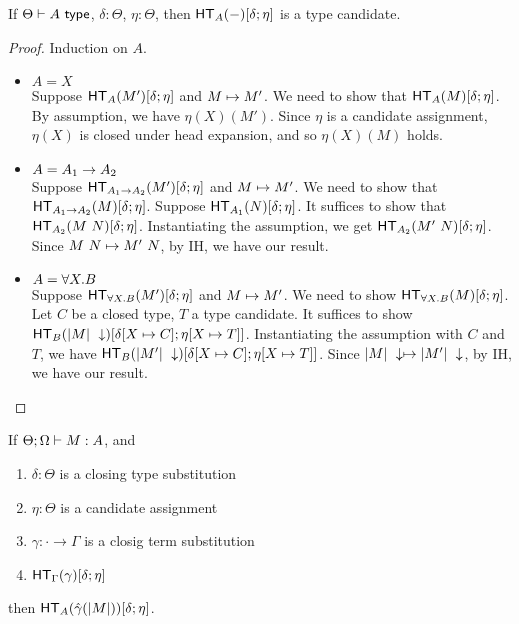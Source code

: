 \documentclass{article}
\begin{document}
\begin{lemma}\label{lem:head_exp}
If $\Theta \vdash A\ \mathsf{type}$, $\delta : \Theta$, $\eta : \Theta$, then $\mathsf{HT}_{A}(-)[\delta;\eta]$ is a type candidate. 
\end{lemma}
\begin{proof}
Induction on $A$.
\begin{itemize}
\setlength\itemsep{1em}
\item $A = X$\\
Suppose $\mathsf{HT}_{A}(M')[\delta;\eta]$ and $M \mapsto M'$. We need to show that $\mathsf{HT}_{A}(M)[\delta;\eta]$.
By assumption, we have $\eta(X)(M')$. Since $\eta$ is a candidate assignment, $\eta(X)$ is closed under head expansion,
and so $\eta(X)(M)$ holds.
\item $A = A_1 \to A_2$\\
Suppose $\mathsf{HT}_{A_1 \to A_2}(M')[\delta;\eta]$ and $M \mapsto M'$. 
We need to show that $\mathsf{HT}_{A_1 \to A_2}(M)[\delta;\eta]$. Suppose $\mathsf{HT}_{A_1}(N)[\delta;\eta]$. 
It suffices to show that $\mathsf{HT}_{A_2}(M\ N)[\delta;\eta]$. Instantiating the assumption, we get
$\mathsf{HT}_{A_2}(M'\ N)[\delta;\eta]$. Since $M\ N \mapsto M'\ N$, by IH, we have our result.
\item $A = \forall X. B$\\
Suppose $\mathsf{HT}_{\forall X. B}(M')[\delta;\eta]$ and $M \mapsto M'$. 
We need to show $\mathsf{HT}_{\forall X. B}(M)[\delta;\eta]$. Let $C$ be a closed type, $T$ a type candidate. 
It suffices to show $\mathsf{HT}_{B}(|M|\ \downarrow)[\delta[X \mapsto C];\eta[X \mapsto T]]$.
Instantiating the assumption with $C$ and $T$, we have 
$\mathsf{HT}_{B}(|M'|\ \downarrow)[\delta[X \mapsto C];\eta[X \mapsto T]]$. 
Since $|M|\ \downarrow \mapsto |M'|\ \downarrow$, by IH, we have our result.
\end{itemize}
\end{proof}

\begin{theorem}
If $\Theta;\Omega \vdash M : A$, and 
\begin{enumerate}
\item $\delta : \Theta$ is a closing type substitution 
\item $\eta : \Theta$ is a candidate assignment 
\item $\gamma : \cdot \to \Gamma$ is a closig term substitution
\item $\mathsf{HT}_{\Gamma}(\gamma)[\delta;\eta]$
\end{enumerate}
then $\mathsf{HT}_{A}(\hat\gamma(|M|))[\delta;\eta]$.
\end{theorem}
\end{document}
